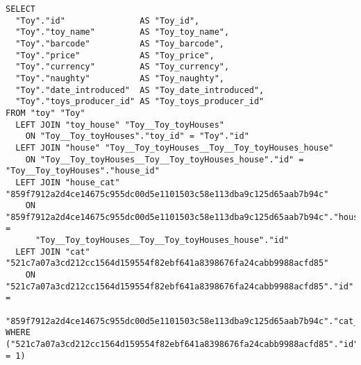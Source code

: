 \begin{verbatim}
SELECT 
  "Toy"."id"               AS "Toy_id",
  "Toy"."toy_name"         AS "Toy_toy_name",
  "Toy"."barcode"          AS "Toy_barcode",
  "Toy"."price"            AS "Toy_price",
  "Toy"."currency"         AS "Toy_currency",
  "Toy"."naughty"          AS "Toy_naughty",
  "Toy"."date_introduced"  AS "Toy_date_introduced",
  "Toy"."toys_producer_id" AS "Toy_toys_producer_id"
FROM "toy" "Toy"
  LEFT JOIN "toy_house" "Toy__Toy_toyHouses" 
    ON "Toy__Toy_toyHouses"."toy_id" = "Toy"."id"
  LEFT JOIN "house" "Toy__Toy_toyHouses__Toy__Toy_toyHouses_house"
    ON "Toy__Toy_toyHouses__Toy__Toy_toyHouses_house"."id" = "Toy__Toy_toyHouses"."house_id"
  LEFT JOIN "house_cat" "859f7912a2d4ce14675c955dc00d5e1101503c58e113dba9c125d65aab7b94c"
    ON "859f7912a2d4ce14675c955dc00d5e1101503c58e113dba9c125d65aab7b94c"."house_id" =
      "Toy__Toy_toyHouses__Toy__Toy_toyHouses_house"."id"
  LEFT JOIN "cat" "521c7a07a3cd212cc1564d159554f82ebf641a8398676fa24cabb9988acfd85"
    ON "521c7a07a3cd212cc1564d159554f82ebf641a8398676fa24cabb9988acfd85"."id" =
      "859f7912a2d4ce14675c955dc00d5e1101503c58e113dba9c125d65aab7b94c"."cat_id"
WHERE ("521c7a07a3cd212cc1564d159554f82ebf641a8398676fa24cabb9988acfd85"."id" = 1)
\end{verbatim}

